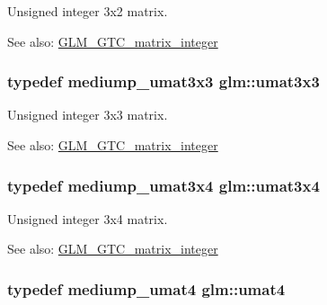 Unsigned integer 3x2 matrix. \begin{Desc}
\item[See also:]\hyperlink{group__gtc__matrix__integer}{GLM\_\-GTC\_\-matrix\_\-integer} \end{Desc}
\hypertarget{group__gtc__matrix__integer_gb80b6501ba1b2c40119a0f2d256f4c97}{
\subsubsection[umat3x3]{\setlength{\rightskip}{0pt plus 5cm}typedef mediump\_\-umat3x3 {\bf glm::umat3x3}}}
\label{group__gtc__matrix__integer_gb80b6501ba1b2c40119a0f2d256f4c97}


Unsigned integer 3x3 matrix. \begin{Desc}
\item[See also:]\hyperlink{group__gtc__matrix__integer}{GLM\_\-GTC\_\-matrix\_\-integer} \end{Desc}
\hypertarget{group__gtc__matrix__integer_g5410857d098a989a30b4017100bc2ff7}{
\subsubsection[umat3x4]{\setlength{\rightskip}{0pt plus 5cm}typedef mediump\_\-umat3x4 {\bf glm::umat3x4}}}
\label{group__gtc__matrix__integer_g5410857d098a989a30b4017100bc2ff7}


Unsigned integer 3x4 matrix. \begin{Desc}
\item[See also:]\hyperlink{group__gtc__matrix__integer}{GLM\_\-GTC\_\-matrix\_\-integer} \end{Desc}
\hypertarget{group__gtc__matrix__integer_g7ae562000d8a8d193e9f93cf51e2e113}{
\subsubsection[umat4]{\setlength{\rightskip}{0pt plus 5cm}typedef mediump\_\-umat4 {\bf glm::umat4}}}
\label{group__gtc__matrix__integer_g7ae562000d8a8d193e9f93cf51e2e113}



